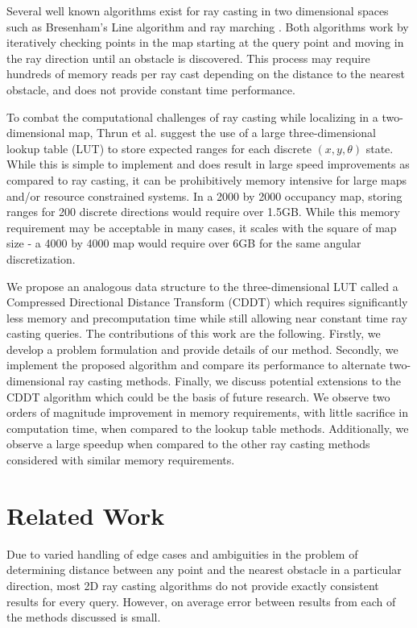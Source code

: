 \documentclass[letterpaper, 10 pt, conference]{ieeeconf}  %
\begin{document}
Several well known algorithms exist for ray casting in two dimensional spaces such as Bresenham's Line algorithm \cite{bresenham} and ray marching \cite{raymarching}. Both algorithms work by iteratively checking points in the map starting at the query point and moving in the ray direction until an obstacle is discovered. This process may require hundreds of memory reads per ray cast depending on the distance to the nearest obstacle, and does not provide constant time performance. 

To combat the computational challenges of ray casting while localizing in a two-dimensional map, Thrun et al. \cite{localization} suggest the use of a large three-dimensional lookup table (LUT) to store expected ranges for each discrete $(x,y,\theta)$ state. While this is simple to implement and does result in large speed improvements as compared to ray casting, it can be prohibitively memory intensive for large maps and/or resource constrained systems. In a 2000 by 2000 occupancy map, storing ranges for 200 discrete directions would require over 1.5GB. While this memory requirement may be acceptable in many cases, it scales with the square of map size - a 4000 by 4000 map would require over 6GB for the same angular discretization.

We propose an analogous data structure to the three-dimensional LUT called a Compressed Directional Distance Transform (CDDT) which requires significantly less memory and precomputation time while still allowing near constant time ray casting queries. The contributions of this work are the following. Firstly, we develop a problem formulation and provide details of our method. Secondly, we implement the proposed algorithm and compare its performance to alternate two-dimensional ray casting methods. Finally, we discuss potential extensions to the CDDT algorithm which could be the basis of future research. We observe two orders of magnitude improvement in memory requirements, with little sacrifice in computation time, when compared to the lookup table methods. Additionally, we observe a large speedup when compared to the other ray casting methods considered with similar memory requirements.

\section{Related Work}

Due to varied handling of edge cases and ambiguities in the problem of determining distance between any point and the nearest obstacle in a particular direction, most 2D ray casting algorithms do not provide exactly consistent results for every query. However, on average error between results from each of the methods discussed is small.
\end{document}
